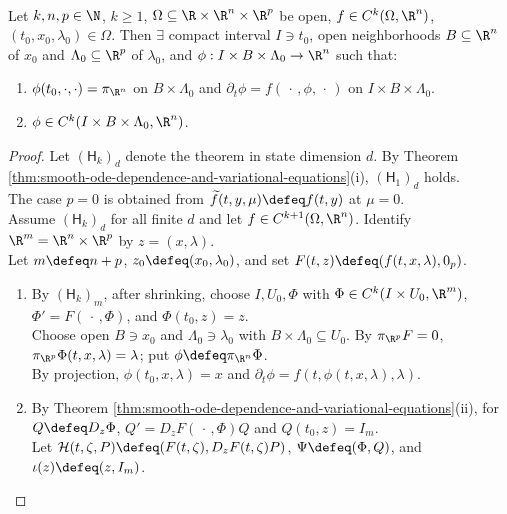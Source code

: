 \begin{theorem} \label{thm:higher-order-smooth-ode-dependence} \\
Let $k,n,p\in\N$, $k\geq1$, $\Omega\subseteq\R\times\R^n\times\R^p$ be open, $f\in C^k(\Omega,\R^n)$, $(t_0,x_0,\lambda_0)\in\Omega$. Then $\exists$ compact interval $I\ni t_0$, open neighborhoods $B\subseteq\R^n$ of $x_0$ and $\Lambda_0\subseteq\R^p$ of $\lambda_0$, and $\phi:I\times B\times\Lambda_0\to\R^n$ such that:
\begin{enumerate}[label=(\roman*)]
\setlength{\itemsep}{0pt}
\item $\phi(t_0,\cdot,\cdot)=\pi_{\R^n}$ on $B\times\Lambda_0$ and $\partial_t\phi=f(\,\cdot\,,\phi,\,\cdot\,)$ on $I\times B\times\Lambda_0$.
\item $\phi\in C^k(I\times B\times\Lambda_0,\R^n)$.
\end{enumerate}
\begin{proof}
Let $(\mathsf H_k)_d$ denote the theorem in state dimension $d$. By Theorem \ref{thm:smooth-ode-dependence-and-variational-equations}(i), $(\mathsf H_1)_d$ holds.\\
The case $p=0$ is obtained from $\widetilde f(t,y,\mu)\defeq f(t,y)$ at $\mu=0$.\\
Assume $(\mathsf H_k)_d$ for all finite $d$ and let $f\in C^{k+1}(\Omega,\R^n)$. Identify $\R^m=\R^n\times\R^p$ by $z=(x,\lambda)$.\\
Let $m\defeq n+p$, $z_0\defeq(x_0,\lambda_0)$, and set $F(t,z)\defeq(f(t,x,\lambda),0_p)$.
\begin{enumerate}[label=(\roman*)]
\setlength{\itemsep}{0pt}
\item By $(\mathsf H_k)_m$, after shrinking, choose $I,U_0,\Phi$ with $\Phi\in C^k(I\times U_0,\R^m)$, $\Phi'=F(\,\cdot\,,\Phi)$, and $\Phi(t_0,z)=z$.\\
Choose open $B\ni x_0$ and $\Lambda_0\ni\lambda_0$ with $B\times\Lambda_0\subseteq U_0$. By $\pi_{\R^p}F=0$, $\pi_{\R^p}\Phi(t,x,\lambda)=\lambda$; put $\phi\defeq\pi_{\R^n}\Phi$.\\
By projection, $\phi(t_0,x,\lambda)=x$ and $\partial_t\phi=f(t,\phi(t,x,\lambda),\lambda)$.
\item By Theorem \ref{thm:smooth-ode-dependence-and-variational-equations}(ii), for $Q\defeq D_z\Phi$, $Q'=D_zF(\,\cdot\,,\Phi)Q$ and $Q(t_0,z)=I_m$.\\
Let $\mathcal H(t,\zeta,P)\defeq(F(t,\zeta),D_zF(t,\zeta)P)$, $\Psi\defeq(\Phi,Q)$, and $\iota(z)\defeq(z,I_m)$.\\

\end{enumerate}
\end{proof}
\end{theorem}
